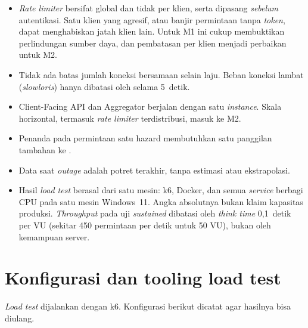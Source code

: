 \begin{itemize}
 \item \emph{Rate limiter} bersifat global dan tidak per klien, serta dipasang \emph{sebelum} autentikasi. Satu klien yang agresif, atau banjir permintaan tanpa \emph{token}, dapat menghabiskan jatah klien lain. Untuk M1 ini cukup membuktikan perlindungan sumber daya, dan pembatasan per klien menjadi perbaikan untuk M2.
 \item Tidak ada batas jumlah koneksi bersamaan selain laju. Beban koneksi lambat (\emph{slowloris}) hanya dibatasi oleh  selama 5~detik.
 \item Client-Facing API dan Aggregator berjalan dengan satu \emph{instance}. Skala horizontal, termasuk \emph{rate limiter} terdistribusi, masuk ke M2.
 \item Penanda  pada permintaan satu hazard membutuhkan satu panggilan tambahan ke .
 \item Data saat \emph{outage} adalah potret terakhir, tanpa estimasi atau ekstrapolasi.
 \item Hasil \emph{load test} berasal dari satu mesin: k6, Docker, dan semua \emph{service} berbagi CPU pada satu mesin Windows~11. Angka absolutnya bukan klaim kapasitas produksi. \emph{Throughput} pada uji \emph{sustained} dibatasi oleh \emph{think time} 0,1~detik per VU (sekitar 450 permintaan per detik untuk 50 VU), bukan oleh kemampuan server.
\end{itemize}

\section{Konfigurasi dan tooling load test}\label{sec:p2-load}

\emph{Load test} dijalankan dengan k6. Konfigurasi berikut dicatat agar hasilnya bisa diulang.

